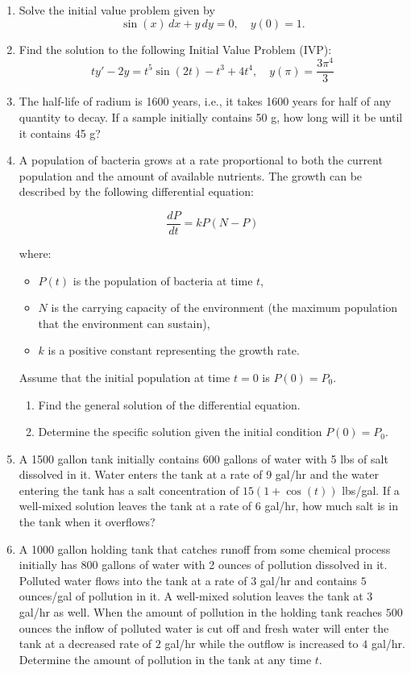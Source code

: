 \documentclass[11pt]{article}
\begin{document}
\begin{enumerate}
\item Solve the initial value problem given by
\[
\sin(x) \, dx + y \, dy = 0, \quad y(0) = 1.
\]


\item Find the solution to the following Initial Value Problem (IVP):
\[
t y' - 2y = t^5 \sin(2t) - t^3 + 4t^4, \quad y(\pi) = \frac{3\pi^4}{3}
\]

\item The half-life of radium is 1600 years, i.e., it takes 1600 years for half of any quantity to decay. If a sample initially contains 50 g, how long will it be until it contains 45 g?

\item 
A population of bacteria grows at a rate proportional to both the current population and the amount of available nutrients. The growth can be described by the following differential equation:

\[
\frac{dP}{dt} = kP(N - P)
\]

where:
\begin{itemize}
    \item \( P(t) \) is the population of bacteria at time \( t \),
    \item \( N \) is the carrying capacity of the environment (the maximum population that the environment can sustain),
    \item \( k \) is a positive constant representing the growth rate.
\end{itemize}

Assume that the initial population at time \( t = 0 \) is \( P(0) = P_0 \).

\begin{enumerate}
    \item Find the general solution of the differential equation.
    \item Determine the specific solution given the initial condition \( P(0) = P_0 \).
\end{enumerate}



\item
A 1500 gallon tank initially contains 600 gallons of water with 5 lbs of salt dissolved in it. Water enters the tank at a rate of 9 gal/hr and the water entering the tank has a salt concentration of \(15(1+\cos(t))\) lbs/gal. If a well-mixed solution leaves the tank at a rate of 6 gal/hr, how much salt is in the tank when it overflows?

\item
A 1000 gallon holding tank that catches runoff from some chemical process initially has 800 gallons of water with 2 ounces of pollution dissolved in it. Polluted water flows into the tank at a rate of 3 gal/hr and contains \(5\) ounces/gal of pollution in it. A well-mixed solution leaves the tank at \(3\) gal/hr as well. When the amount of pollution in the holding tank reaches \(500\) ounces the inflow of polluted water is cut off and fresh water will enter the tank at a decreased rate of \(2\) gal/hr while the outflow is increased to \(4\) gal/hr. Determine the amount of pollution in the tank at any time \(t\).


\end{enumerate}
\end{document}

